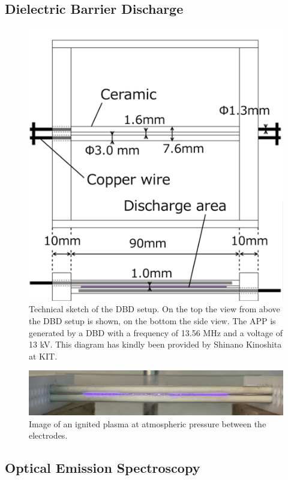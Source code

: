 \subsection{Dielectric Barrier Discharge}
\begin{figure}
    \centering
    \includegraphics[width=.8\textwidth]{images/APP_setup.png}
    \caption[Technical sketch of the DBD setup]{Technical sketch of the DBD setup. On the top the view from above the DBD setup is shown, on the bottom the side view. The APP is generated by a DBD with a frequency of 13.56 MHz and a voltage of 13 kV. This diagram has kindly been provided by Shinano Kinoshita at KIT.}
    \label{fig:dbd}
\end{figure}

\begin{figure}
    \centering
    \includegraphics[width=1\textwidth]{images/Plasma.png}
    \caption[Image of the APP]{Image of an ignited plasma at atmospheric pressure between the electrodes.}
    \label{fig:plasma}
\end{figure}


\subsection{Optical Emission Spectroscopy}

